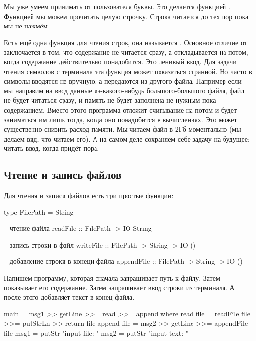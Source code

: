 Мы уже умеем принимать от пользователя буквы. Это
делается функцией . Функцией 
мы можем прочитать целую строчку. Строка читается
до тех пор пока мы не нажмём .


Есть ещё одна функция для чтения строк, она называется
. Основное отличие от  
заключается в том, что содержание не читается сразу,
а откладывается на потом, когда содержание действительно
понадобится. Это ленивый ввод. Для задачи чтения символов
с терминала эта функция может показаться странной.
Но часто в символы вводятся не вручную, а передаются из 
другого файла. Например если мы направим на ввод данные
из-какого-нибудь большого-большого файла, файл не будет
читаться сразу, и память не будет заполнена не нужным 
пока содержанием. Вместо этого программа отложит считывание
на потом и будет заниматься им лишь тогда, когда оно понадобится
в вычислениях. Это может существенно снизить расход памяти.
Мы читаем файл в 2Гб моментально (мы делаем вид, что читаем его).
А на самом деле сохраняем себе задачу на будущее: читать ввод,
когда придёт пора.

\subsection{Чтение и запись файлов}

Для чтения и записи файлов есть три простые функции:

\begin{code}
type FilePath = String

-- чтение файла
readFile    :: FilePath -> IO String

-- запись строки в файл
writeFile   :: FilePath -> String -> IO ()

-- добавление строки в конеци файла
appendFile  :: FilePath -> String -> IO ()
\end{code}

Напишем программу, которая сначала запрашивает путь к файлу.
Затем показывает его содержание. Затем запрашивает ввод строки
из терминала. А после этого добавляет текст в конец файла.

\begin{code}
main = msg1 >> getLine >>= read >>= append
    where read   file = readFile file >>= putStrLn >> return file
          append file = msg2 >> getLine >>= appendFile file
          msg1        = putStr "input file: "
          msg2        = putStr "input text: "
\end{code}

